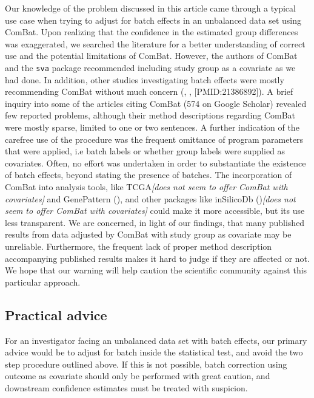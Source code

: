 \documentclass{bio}
\newcommand\COMMENT[2]{\textcolor{COMMENTcol}{#1}\NOTE{#2}}
\newcommand\NB[1]{\textcolor{NBcol}{\textit{#1}}}
\newcommand\NOTE[1]{\NB{[#1]}}
\newcommand\CITE[1]{\textcolor{CITEcol}{[#1]}}
\begin{document}
Our knowledge of the problem discussed in this article came through a typical use case when trying to adjust for batch effects in an unbalanced data set using ComBat. Upon realizing that the confidence in the estimated group differences was exaggerated, we searched the literature for a better understanding of correct use and the potential limitations of ComBat. However, the authors of ComBat and the \texttt{sva} package recommended including study group as a covariate as we had done. In addition, other studies investigating batch effects were mostly recommending ComBat without much concern (\citealp{Kupfer2012}, \citealp{Kitchen2011}, \CITE{PMID:21386892}). A brief inquiry into  some of the articles citing ComBat (574 on Google Scholar) revealed few reported problems, although their method descriptions regarding ComBat were mostly sparse, limited to one or two sentences. A further indication of the carefree use of the procedure was the frequent omittance of program parameters that were applied, i.e batch labels or whether group labels were supplied as covariates. Often, no effort was undertaken in order to substantiate the existence of batch effects, beyond stating the presence of batches. The incorporation of ComBat into analysis tools, like \COMMENT{TCGA}{does not seem to offer ComBat with covariates} and GenePattern (\citealp{Reich2006}), and other packages like \COMMENT{inSilicoDb (\citealp{Taminau2011})}{does not seem to offer ComBat with covariates} could make it more accessible, but its use less transparent. We are concerned, in light of our findings, that many published results from data adjusted by ComBat with study group as covariate may be unreliable. Furthermore, the frequent lack of proper method description accompanying published results makes it hard to judge if they are affected or not. We hope that our warning will help caution the scientific community against this particular approach.


\subsection{Practical advice}

For an investigator facing an unbalanced data set with batch effects, our primary advice would be to adjust for batch inside the statistical test, and avoid the two step procedure outlined above. If this is not possible, batch correction using outcome as covariate should only be performed with great caution, and downstream confidence estimates must be treated with suspicion.
\end{document}
